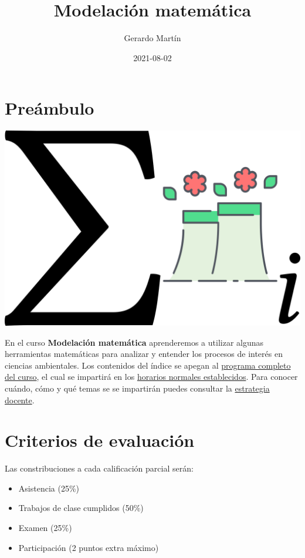 \documentclass[
]{book}
\title{Modelación matemática}
\author{Gerardo Martín}
\date{2021-08-02}
\providecommand{\tightlist}{%
  \setlength{\itemsep}{0pt}\setlength{\parskip}{0pt}}
\begin{document}
\maketitle

{
\setcounter{tocdepth}{1}
\tableofcontents
}
\hypertarget{preuxe1mbulo}{%
\chapter{Preámbulo}\label{preuxe1mbulo}}

\begin{center}\includegraphics[width=20.83in]{logo} \end{center}

En el curso \textbf{Modelación matemática} aprenderemos a utilizar algunas herramientas matemáticas para analizar y entender los procesos de interés en ciencias ambientales. Los contenidos del índice se apegan al \href{Programa-curso.pdf}{programa completo del curso}, el cual se impartirá en los \href{Horario.pdf}{horarios normales establecidos}. Para conocer cuándo, cómo y qué temas se se impartirán puedes consultar la \href{Estrategia-docente.pdf}{estrategia docente}.

\hypertarget{criterios-de-evaluaciuxf3n}{%
\chapter{Criterios de evaluación}\label{criterios-de-evaluaciuxf3n}}

Las constribuciones a cada calificación parcial serán:

\begin{itemize}
\tightlist
\item
  Asistencia (25\%)
\item
  Trabajos de clase cumplidos (50\%)
\item
  Examen (25\%)
\item
  Participación (2 puntos extra máximo)
\end{itemize}
\end{document}
